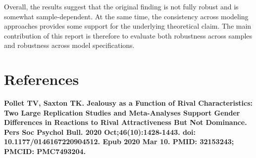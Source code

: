 \documentclass[12pt]{article}
\begin{document}
	Overall, the results suggest that the original finding is not fully robust and is somewhat sample-dependent. At the same time, the consistency across modeling approaches provides some support for the underlying theoretical claim. The main contribution of this report is therefore to evaluate both robustness across samples and robustness across model specifications.
	
	
		\section{References}
		
		\textbf{Pollet TV, Saxton TK. Jealousy as a Function of Rival Characteristics: Two Large Replication Studies and Meta-Analyses Support Gender Differences in Reactions to Rival Attractiveness But Not Dominance. Pers Soc Psychol Bull. 2020 Oct;46(10):1428-1443. doi: 10.1177/0146167220904512. Epub 2020 Mar 10. PMID: 32153243; PMCID: PMC7493204.}
		
		
\end{document}
